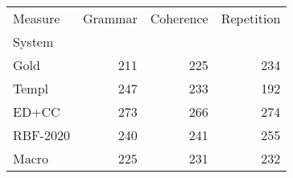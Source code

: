 \begin{tabular}{lrrr}
\toprule
Measure & Grammar & Coherence & Repetition \\
System &  &  &  \\
\midrule
Gold & 211 & 225 & 234 \\
Templ & 247 & 233 & 192 \\
ED+CC & 273 & 266 & 274 \\
RBF-2020 & 240 & 241 & 255 \\
Macro & 225 & 231 & 232 \\
\bottomrule
\end{tabular}
